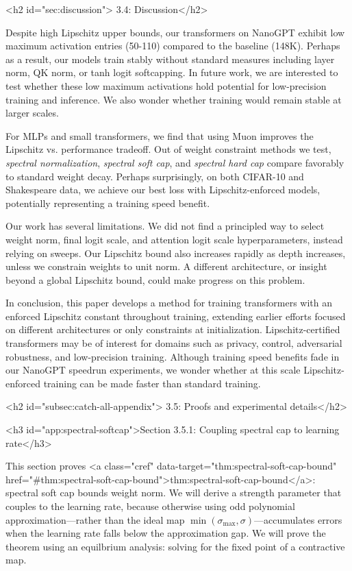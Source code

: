 <h2 id="sec:discussion"> 3.4: Discussion</h2>

Despite high Lipschitz upper bounds, our transformers on NanoGPT exhibit low maximum activation entries (50-110) compared to the baseline (148K). Perhaps as a result, our models train stably without standard measures including layer norm, QK norm, or tanh logit softcapping. In future work, we are interested to test whether these low maximum activations hold potential for low-precision training and inference. We also wonder whether training would remain stable at larger scales.

For MLPs and small transformers, we find that using Muon improves the Lipschitz vs. performance tradeoff. Out of weight constraint methods we test, \textit{spectral normalization}, \textit{spectral soft cap}, and \textit{spectral hard cap} compare favorably to standard weight decay. Perhaps surprisingly, on both CIFAR-10 and Shakespeare data, we achieve our best loss with Lipschitz-enforced models, potentially representing a training speed benefit.

Our work has several limitations. We did not find a principled way to select weight norm, final logit scale, and attention logit scale hyperparameters, instead relying on sweeps. Our Lipschitz bound also increases rapidly as depth increases, unless we constrain weights to unit norm. A different architecture, or insight beyond a global Lipschitz bound, could make progress on this problem.

In conclusion, this paper develops a method for training transformers with an enforced Lipschitz constant throughout training, extending earlier efforts focused on different architectures or only constraints at initialization. Lipschitz-certified transformers may be of interest for domains such as privacy, control, adversarial robustness, and low-precision training. Although training speed benefits fade in our NanoGPT speedrun experiments, we wonder whether at this scale Lipschitz-enforced training can be made faster than standard training.


<h2 id="subsec:catch-all-appendix"> 3.5: Proofs and experimental details</h2>


<h3 id="app:spectral-softcap">Section 3.5.1: Coupling spectral cap to learning rate</h3>

This section proves <a class="cref" data-target="thm:spectral-soft-cap-bound" href="#thm:spectral-soft-cap-bound">thm:spectral-soft-cap-bound</a>: spectral soft cap bounds weight norm. We will derive a strength parameter that couples to the learning rate, because otherwise using odd polynomial approximation---rather than the ideal map $\min(\sigma_\text{max}, \sigma)$---accumulates errors when the learning rate falls below the approximation gap. We will prove the theorem using an equilbrium analysis: solving for the fixed point of a contractive map.

